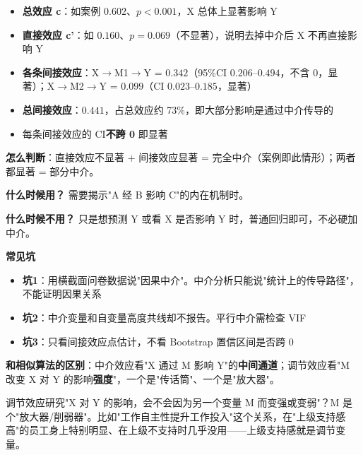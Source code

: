 \begin{algoresult}
\begin{itemize}
    \item \textbf{总效应 c}：如案例 $0.602$、$p<0.001$，X 总体上显著影响 Y
    \item \textbf{直接效应 c'}：如 $0.160$、$p=0.069$（不显著），说明去掉中介后 X 不再直接影响 Y
    \item \textbf{各条间接效应}：X$\to$M1$\to$Y = $0.342$（95\%CI $0.206$--$0.494$，不含 0，显著）；X$\to$M2$\to$Y = $0.099$（CI $0.023$--$0.185$，显著）
    \item \textbf{总间接效应}：$0.441$，占总效应约 73\%，即大部分影响是通过中介传导的
    \item 每条间接效应的 CI\textbf{不跨 0} 即显著
\end{itemize}

\textbf{怎么判断}：直接效应不显著 + 间接效应显著 = 完全中介（案例即此情形）；两者都显著 = 部分中介。
\end{algoresult}

\begin{algonotes}
\textbf{什么时候用？} 需要揭示"A 经 B 影响 C"的内在机制时。

\textbf{什么时候不用？} 只是想预测 Y 或看 X 是否影响 Y 时，普通回归即可，不必硬加中介。

\textbf{常见坑}
\begin{itemize}
    \item \textbf{坑1}：用横截面问卷数据说"因果中介"。中介分析只能说"统计上的传导路径"，不能证明因果关系
    \item \textbf{坑2}：中介变量和自变量高度共线却不报告。平行中介需检查 VIF
    \item \textbf{坑3}：只看间接效应点估计，不看 Bootstrap 置信区间是否跨 0
\end{itemize}

\textbf{和相似算法的区别}：中介效应看"X 通过 M 影响 Y"的\textbf{中间通道}；调节效应看"M 改变 X 对 Y 的影响\textbf{强度}"，一个是"传话筒"、一个是"放大器"。
\end{algonotes}


\begin{algointro}
调节效应研究"X 对 Y 的影响，会不会因为另一个变量 M 而变强或变弱"？M 是个"放大器/削弱器"。比如"工作自主性提升工作投入"这个关系，在"上级支持感高"的员工身上特别明显、在上级不支持时几乎没用——上级支持感就是调节变量。
\end{algointro}

